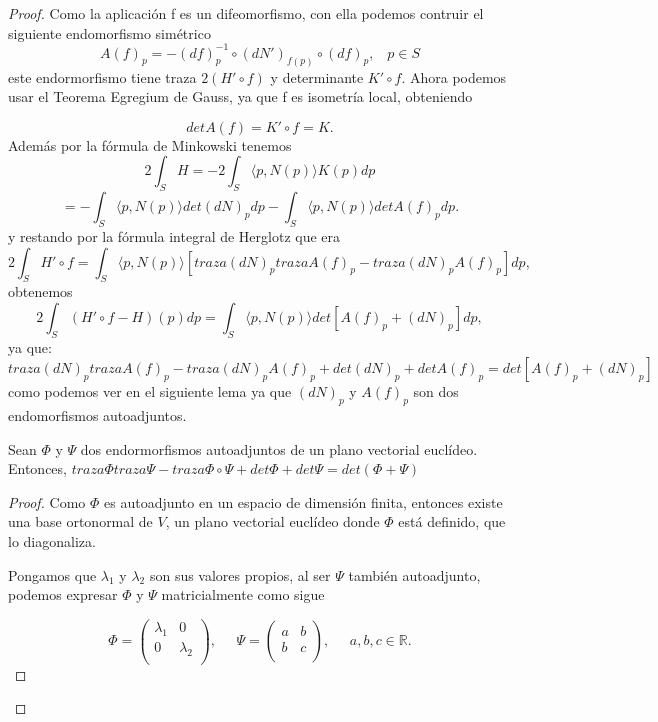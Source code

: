 \begin{proof}
	Como la aplicación f es un difeomorfismo, con ella podemos contruir el siguiente endomorfismo simétrico
	\[
		A(f)_p = -(df)^{-1}_{p} \circ (dN')_{f(p)} \circ (df)_p, \;\;\; p \in S
	\]
	este endormorfismo tiene traza $2(H' \circ f)$ y determinante $K' \circ f$. Ahora podemos usar el Teorema Egregium de Gauss, ya que f es isometría local, obteniendo
	
	\[
		det A(f) = K' \circ f = K.
	\]
	Además por la fórmula de Minkowski tenemos
	\[
		2 \int_S H = -2 \int_S \langle p, N(p) \rangle K(p) dp
	\]
	\[
		= - \int_S \langle p, N(p) \rangle det(dN)_p dp - \int_S \langle p, N(p) \rangle det A(f)_p dp.
	\]
	y restando por la fórmula integral de Herglotz que era
	\[
		2 \int_S H' \circ f = \int_S \langle p, N(p) \rangle [traza(dN)_p trazaA(f)_p - traza(dN)_p A(f)_p] dp,
	\]
	obtenemos
	\[
		2 \int_S (H' \circ f - H)(p) dp = \int_S \langle p, N(p) \rangle det[A(f)_p + (dN)_p] dp,
	\]
	ya que: $$traza(dN)_p trazaA(f)_p - traza(dN)_p A(f)_p + det(dN)_p + det A(f)_p = det[A(f)_p + (dN)_p]$$ como podemos ver en el siguiente lema ya que $(dN)_p$ y $A(f)_p$ son dos endomorfismos autoadjuntos.
${ }$\\

	\begin{lema}
		Sean $\Phi$ y $\Psi$ dos endormorfismos autoadjuntos de un plano vectorial euclídeo. Entonces, $traza \Phi traza\Psi - traza \Phi \circ \Psi + det \Phi + det \Psi = det (\Phi + \Psi)$
	\end{lema}
	
	\begin{proof}
		Como $\Phi$ es autoadjunto en un espacio de dimensión finita, entonces existe una base ortonormal de $V$, un plano vectorial euclídeo donde $\Phi$ está definido, que lo diagonaliza.
		
		Pongamos que $\lambda_1$ y $\lambda_2$ son sus valores propios, al ser $\Psi$ también autoadjunto, podemos expresar $\Phi$ y $\Psi$ matricialmente como sigue
		
		\[
			\Phi = \left( {\begin{array}{cc}
				\lambda_1 & 0 \\
				0 & \lambda_2 \\
				\end{array} } \right),
			\;\;\;\;\;
			\Psi = \left( {\begin{array}{cc}
				a & b \\
				b & c \\
				\end{array} } \right), \;\;\;\;\; a, b,c \in \mathbb{R}.
		\]
		

\end{proof}
\end{proof}
